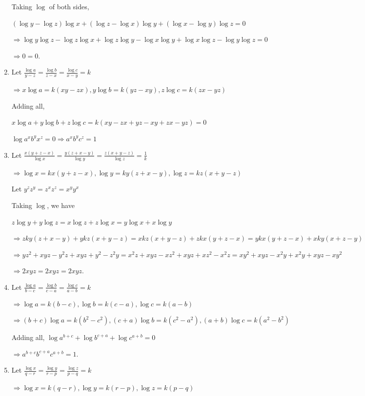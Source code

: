 \begin{enumerate}
  Taking $\log$ of both sides,

  $(\log y - \log z)\log x + (\log z - \log x)\log y + (\log x - \log y)\log z = 0$

  $\Rightarrow \log y\log z - \log z\log x + \log z\log y - \log x\log y + \log x\log z - \log y\log z = 0$

  $\Rightarrow 0 = 0$.
\item Let $\frac{\log a}{y - z} = \frac{\log b}{z - x} = \frac{\log c}{x - y} = k$

  $\Rightarrow x\log a = k(xy - zx), y\log b = k(yz - xy), z\log c = k(zx - yz)$

  Adding all,

  $x\log a + y\log b + z\log c = k(xy - zx + yz - xy + zx - yz) = 0$

  $\log a^xb^yx^z = 0\Rightarrow a^xb^yc^z = 1$
\item Let $\frac{x(y + z - x)}{\log x} = \frac{y(z + x - y)}{\log y} = \frac{z(x + y - z)}{\log z} = \frac{1}{k}$

  $\Rightarrow \log x = kx(y + z - x), \log y = ky(z + x - y), \log z = kz(x + y - z)$

  Let $y^zz^y = z^xz^z = x^yy^x$

  Taking $\log$, we have

  $z\log y + y\log z = x\log z + z\log x = y\log x + x\log y$

  $\Rightarrow zky(z + x - y) + ykz(x + y - z) = xkz(x + y - z) + zkx(y + z - x) = ykx(y + z - x) + xky(x + z - y)$

  $\Rightarrow yz^2 + xyz - y^2z + xyz + y^2 - z^2y = x^2z + xyz - xz^2 + xyz + xz^2 - x^2z = xy^2 + xyz - x^2y + x^2y + xyz -
  xy^2$

  $\Rightarrow 2xyz = 2xyz = 2xyz$.
\item Let $\frac{\log a}{b - c} = \frac{\log b}{c - a} = \frac{\log c}{a - b} = k$

  $\Rightarrow \log a = k(b - c), \log b = k(c - a), \log c = k(a - b)$

  $\Rightarrow (b + c)\log a = k(b^2 - c^2), (c + a)\log b = k(c^2 - a^2), (a + b)\log c = k(a^2 - b^2)$

  Adding all, $\log a^{b + c} + \log b^{c + a} + \log c^{a + b} = 0$

  $\Rightarrow a^{b + c}b^{c + a}c^{a + b} = 1$.
\item Let $\frac{\log x}{q - r} = \frac{\log y}{r - p} = \frac{\log z}{p - q} = k$

  $\Rightarrow \log x = k(q - r), \log y = k(r - p), \log z = k(p - q)$


\end{enumerate}
